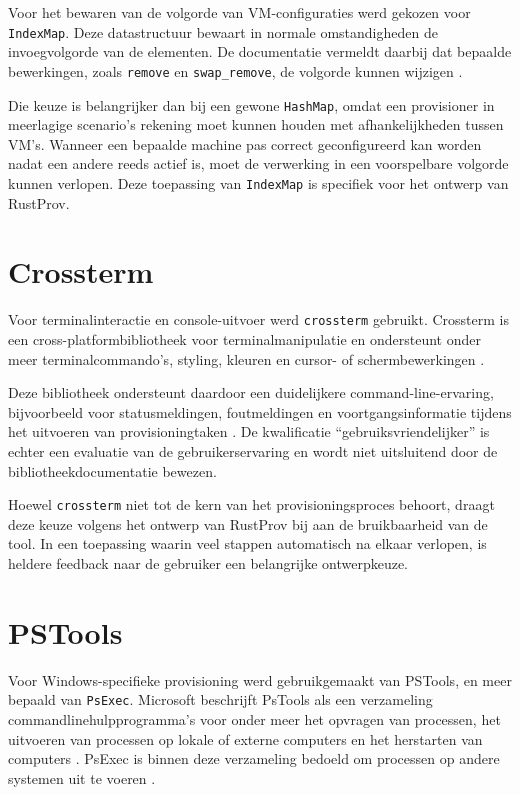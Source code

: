 Voor het bewaren van de volgorde van VM-configuraties werd gekozen voor \texttt{IndexMap}. Deze datastructuur bewaart in normale omstandigheden de invoegvolgorde van de elementen. De documentatie vermeldt daarbij dat bepaalde bewerkingen, zoals \texttt{remove} en \texttt{swap\_remove}, de volgorde kunnen wijzigen \autocite{IndexMapDocs2026}.

Die keuze is belangrijker dan bij een gewone \texttt{HashMap}, omdat een provisioner in meerlagige scenario's rekening moet kunnen houden met afhankelijkheden tussen VM's. Wanneer een bepaalde machine pas correct geconfigureerd kan worden nadat een andere reeds actief is, moet de verwerking in een voorspelbare volgorde kunnen verlopen. Deze toepassing van \texttt{IndexMap} is specifiek voor het ontwerp van RustProv.

\section{Crossterm}

Voor terminalinteractie en console-uitvoer werd \texttt{crossterm} gebruikt. Crossterm is een cross-platformbibliotheek voor terminalmanipulatie en ondersteunt onder meer terminalcommando's, styling, kleuren en cursor- of schermbewerkingen \autocite{CrosstermDocs2026}.

Deze bibliotheek ondersteunt daardoor een duidelijkere command-line-ervaring, bijvoorbeeld voor statusmeldingen, foutmeldingen en voortgangsinformatie tijdens het uitvoeren van provisioningtaken \autocite{CrosstermDocs2026}. De kwalificatie ``gebruiksvriendelijker'' is echter een evaluatie van de gebruikerservaring en wordt niet uitsluitend door de bibliotheekdocumentatie bewezen.

Hoewel \texttt{crossterm} niet tot de kern van het provisioningsproces behoort, draagt deze keuze volgens het ontwerp van RustProv bij aan de bruikbaarheid van de tool. In een toepassing waarin veel stappen automatisch na elkaar verlopen, is heldere feedback naar de gebruiker een belangrijke ontwerpkeuze.

\section{PSTools}

Voor Windows-specifieke provisioning werd gebruikgemaakt van PSTools, en meer bepaald van \texttt{PsExec}. Microsoft beschrijft PsTools als een verzameling commandlinehulpprogramma's voor onder meer het opvragen van processen, het uitvoeren van processen op lokale of externe computers en het herstarten van computers \autocite{RussinovichTools2023}. PsExec is binnen deze verzameling bedoeld om processen op andere systemen uit te voeren \autocite{RussinovichExec2023}.


